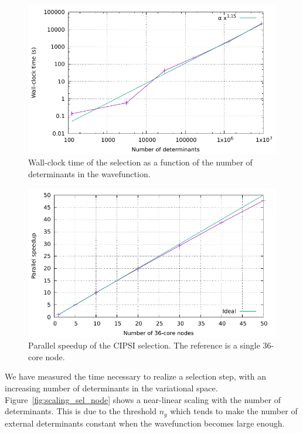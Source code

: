 \documentclass[./thesis.tex]{subfiles}
\begin{document}
\begin{figure}[hbt]
    \begin{center}
      \includegraphics[width=0.8\columnwidth]{figures/perf/scaling_sel_det}
      \caption{Wall-clock time of the selection as a function of the number of
determinants in the wavefunction.}
      \label{fig:scaling_sel_ndet}
    \end{center}
\end{figure}

\begin{figure}[h]
    \begin{center}
      \includegraphics[width=0.8\columnwidth]{figures/perf/scaling_sel_node}
      \caption{Parallel speedup of the CIPSI selection. The reference is a single 36-core node.}
      \label{fig:speedup_sel_node}
    \end{center}
\end{figure}

We have measured the time necessary to realize a selection step, with an
increasing number of determinants in the variational space.
Figure~\ref{fig:scaling_sel_node} shows a near-linear scaling with the number of
determinants. This is due to the threshold $n_g$ which tends to make the number of external determinants constant when the wavefunction becomes large enough.
\end{document}

